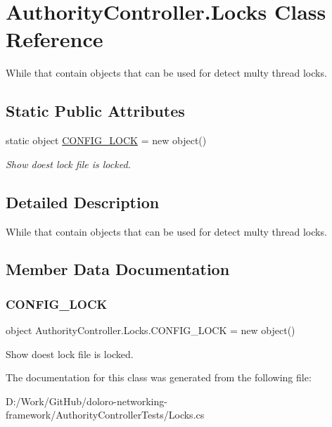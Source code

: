 \hypertarget{class_authority_controller_1_1_locks}{}\section{Authority\+Controller.\+Locks Class Reference}
\label{class_authority_controller_1_1_locks}


While that contain objects that can be used for detect multy thread locks.  


\subsection*{Static Public Attributes}
\begin{DoxyCompactItemize}
\item 
static object \mbox{\hyperlink{class_authority_controller_1_1_locks_a8e6aade829f803f9d8928834a6e59dc8}{C\+O\+N\+F\+I\+G\+\_\+\+L\+O\+CK}} = new object()
\begin{DoxyCompactList}\small\item\em Show doest lock file is locked. \end{DoxyCompactList}\end{DoxyCompactItemize}


\subsection{Detailed Description}
While that contain objects that can be used for detect multy thread locks. 



\subsection{Member Data Documentation}
\mbox{\label{class_authority_controller_1_1_locks_a8e6aade829f803f9d8928834a6e59dc8}} 
\subsubsection{\texorpdfstring{C\+O\+N\+F\+I\+G\+\_\+\+L\+O\+CK}{CONFIG\_LOCK}}
{\footnotesize\ttfamily object Authority\+Controller.\+Locks.\+C\+O\+N\+F\+I\+G\+\_\+\+L\+O\+CK = new object()\hspace{0.3cm}{\ttfamily [static]}}



Show doest lock file is locked. 



The documentation for this class was generated from the following file\+:\begin{DoxyCompactItemize}
\item 
D\+:/\+Work/\+Git\+Hub/doloro-\/networking-\/framework/\+Authority\+Controller\+Tests/Locks.\+cs\end{DoxyCompactItemize}
